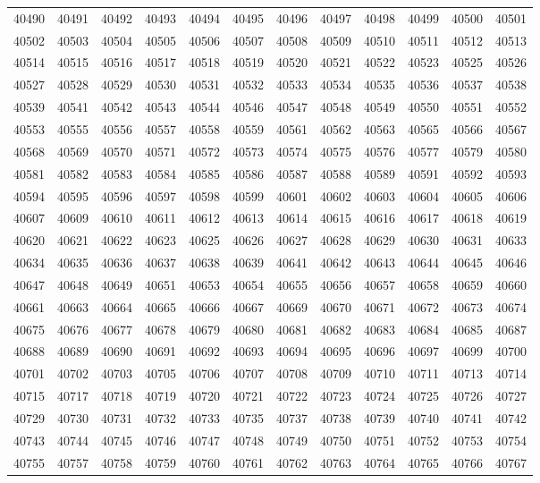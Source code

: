 \begin{center}
\begin{longtable}{llllllllllll}
40490 &40491 &40492 &40493 &40494 &40495 &40496 &40497 &40498 &40499 &40500 &40501 \\
40502 &40503 &40504 &40505 &40506 &40507 &40508 &40509 &40510 &40511 &40512 &40513 \\
40514 &40515 &40516 &40517 &40518 &40519 &40520 &40521 &40522 &40523 &40525 &40526 \\
40527 &40528 &40529 &40530 &40531 &40532 &40533 &40534 &40535 &40536 &40537 &40538 \\
40539 &40541 &40542 &40543 &40544 &40546 &40547 &40548 &40549 &40550 &40551 &40552 \\
40553 &40555 &40556 &40557 &40558 &40559 &40561 &40562 &40563 &40565 &40566 &40567 \\
40568 &40569 &40570 &40571 &40572 &40573 &40574 &40575 &40576 &40577 &40579 &40580 \\
40581 &40582 &40583 &40584 &40585 &40586 &40587 &40588 &40589 &40591 &40592 &40593 \\
40594 &40595 &40596 &40597 &40598 &40599 &40601 &40602 &40603 &40604 &40605 &40606 \\
40607 &40609 &40610 &40611 &40612 &40613 &40614 &40615 &40616 &40617 &40618 &40619 \\
40620 &40621 &40622 &40623 &40625 &40626 &40627 &40628 &40629 &40630 &40631 &40633 \\
40634 &40635 &40636 &40637 &40638 &40639 &40641 &40642 &40643 &40644 &40645 &40646 \\
40647 &40648 &40649 &40651 &40653 &40654 &40655 &40656 &40657 &40658 &40659 &40660 \\
40661 &40663 &40664 &40665 &40666 &40667 &40669 &40670 &40671 &40672 &40673 &40674 \\
40675 &40676 &40677 &40678 &40679 &40680 &40681 &40682 &40683 &40684 &40685 &40687 \\
40688 &40689 &40690 &40691 &40692 &40693 &40694 &40695 &40696 &40697 &40699 &40700 \\
40701 &40702 &40703 &40705 &40706 &40707 &40708 &40709 &40710 &40711 &40713 &40714 \\
40715 &40717 &40718 &40719 &40720 &40721 &40722 &40723 &40724 &40725 &40726 &40727 \\
40729 &40730 &40731 &40732 &40733 &40735 &40737 &40738 &40739 &40740 &40741 &40742 \\
40743 &40744 &40745 &40746 &40747 &40748 &40749 &40750 &40751 &40752 &40753 &40754 \\
40755 &40757 &40758 &40759 &40760 &40761 &40762 &40763 &40764 &40765 &40766 &40767 \\

\end{longtable}
\end{center}

